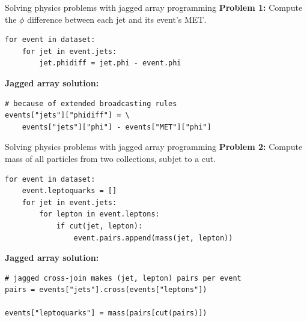 \documentclass[aspectratio=169]{beamer}
\begin{document}
\begin{frame}[fragile]{Solving physics problems with jagged array programming}
\vspace{0.5 cm}
{\bf Problem 1:} Compute the $\phi$ difference between each jet and its event's MET.
\small
\begin{verbatim}
for event in dataset:
    for jet in event.jets:
        jet.phidiff = jet.phi - event.phi
\end{verbatim}
\normalsize

\vspace{0.5 cm}
{\bf Jagged array solution:} 
\small
\begin{verbatim}
# because of extended broadcasting rules
events["jets"]["phidiff"] = \
    events["jets"]["phi"] - events["MET"]["phi"]
\end{verbatim}
\end{frame}

\begin{frame}[fragile]{Solving physics problems with jagged array programming}
\vspace{0.5 cm}
{\bf Problem 2:} Compute mass of all particles from two collections, subjet to a cut.
\small
\begin{verbatim}
for event in dataset:
    event.leptoquarks = []
    for jet in event.jets:
        for lepton in event.leptons:
            if cut(jet, lepton):
                event.pairs.append(mass(jet, lepton))
\end{verbatim}
\normalsize

\vspace{0.5 cm}
{\bf Jagged array solution:} 
\small
\begin{verbatim}
# jagged cross-join makes (jet, lepton) pairs per event
pairs = events["jets"].cross(events["leptons"])

events["leptoquarks"] = mass(pairs[cut(pairs)])
\end{verbatim}
\end{frame}
\end{document}
